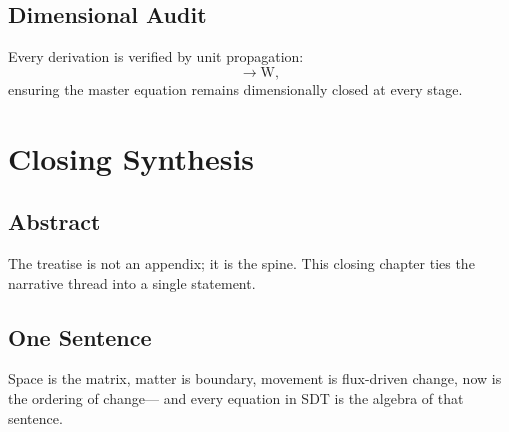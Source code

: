 \documentclass[12pt]{book}
\begin{document}
\section{Dimensional Audit}
Every derivation is verified by unit propagation:
\begin{equation}
[P][A][\Gamma][\kappa] \rightarrow \text{W},
\end{equation}
ensuring the master equation remains dimensionally closed at every stage.

\chapter{Closing Synthesis}

\section*{Abstract}
The treatise is not an appendix; it is the spine. This closing chapter ties the narrative thread into a
single statement.

\section{One Sentence}
Space is the matrix, matter is boundary, movement is flux-driven change, now is the ordering of change—
and every equation in SDT is the algebra of that sentence.
\end{document}
